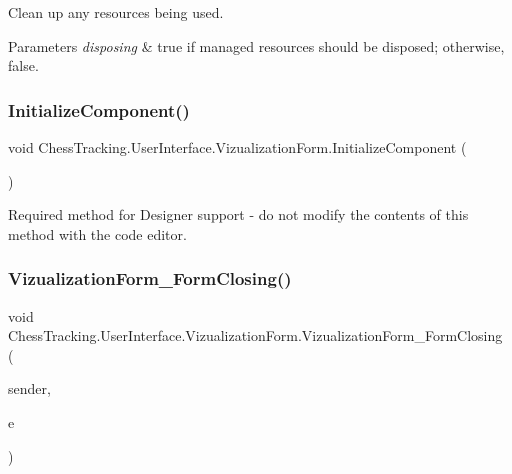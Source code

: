 Clean up any resources being used. 


\begin{DoxyParams}{Parameters}
{\em disposing} & true if managed resources should be disposed; otherwise, false.\\
\hline
\end{DoxyParams}
\mbox{\label{class_chess_tracking_1_1_user_interface_1_1_vizualization_form_a509b1e30f7e42828e98b0b4b874d7592}} 
\subsubsection{\texorpdfstring{InitializeComponent()}{InitializeComponent()}}
{\footnotesize\ttfamily void Chess\+Tracking.\+User\+Interface.\+Vizualization\+Form.\+Initialize\+Component (\begin{DoxyParamCaption}{ }\end{DoxyParamCaption})\hspace{0.3cm}{\ttfamily [private]}}



Required method for Designer support -\/ do not modify the contents of this method with the code editor. 

\mbox{\label{class_chess_tracking_1_1_user_interface_1_1_vizualization_form_a3ffdeb953e96c258a81589c7a3920570}} 
\subsubsection{\texorpdfstring{VizualizationForm\_FormClosing()}{VizualizationForm\_FormClosing()}}
{\footnotesize\ttfamily void Chess\+Tracking.\+User\+Interface.\+Vizualization\+Form.\+Vizualization\+Form\+\_\+\+Form\+Closing (\begin{DoxyParamCaption}\item[{object}]{sender,  }\item[{Form\+Closing\+Event\+Args}]{e }\end{DoxyParamCaption})\hspace{0.3cm}{\ttfamily [private]}}



